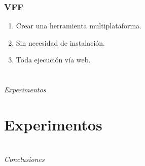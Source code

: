 \documentclass{beamer}
\begin{document}
\begin{frame}
	\frametitle{VFF}
	\begin{enumerate}
		\item Crear una herramienta multiplataforma.
		\item Sin necesidad de instalación.
		\item Toda ejecución vía web.
	\end{enumerate}
\end{frame}
\section*{}
\begin{frame}{}
	\centering \Huge
	\emph{Experimentos}
\end{frame}

\section{Experimentos}
\begin{frame}
\end{frame}

\begin{frame}
\end{frame}

\section*{}
\begin{frame}{}
  \centering \Huge
  \emph{Conclusiones}
\end{frame}
\end{document}
